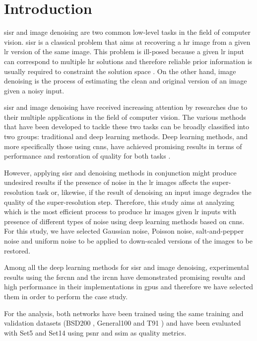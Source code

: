 \section{Introduction}

\Gls{sisr} and image denoising are two common low-level tasks in the field of computer vision. \Gls{sisr} is a classical problem that aims at recovering a \gls{hr} image from a given \gls{lr} version of the same image. This problem is ill-posed because a given \gls{lr} input can correspond to multiple \gls{hr} solutions and therefore reliable prior information is usually required to constraint the solution space \cite{DBLP:SISR} \cite{SRCNN} \cite{DBLP:DEEPSISR}. On the other hand, image denoising is the process of estimating the clean and original version of an image given a noisy input.

\gls{sisr} and image denoising have received increasing attention by researches due to their multiple applications in the field of computer vision. The various methods that have been developed to tackle these two tasks can be broadly classified into two groups: traditional and deep learning methods. Deep learning methods, and more specifically those using \glspl{cnn}, have achieved promising results in terms of performance and restoration of quality for both tasks \cite{DBLP:DEEPNR} \cite{DBLP:DEEPSISR}.

However, applying \gls{sisr} and denoising methods in conjunction might produce undesired results if the presence of noise in the \gls{lr} images affects the super-resolution task or, likewise, if the result of denoising an input image degrades the quality of the super-resolution step. Therefore, this study aims at analyzing which is the most efficient process to produce \gls{hr} images given \gls{lr} inputs with presence of different types of noise using deep learning methods based on \glspl{cnn}. For this study, we have selected Gaussian noise, Poisson noise, salt-and-pepper noise and uniform noise to be applied to down-scaled versions of the images to be restored.

Among all the deep learning methods for \gls{sisr} and image denoising, experimental results using the \gls{fsrcnn} \cite{FSRCNN} and the \gls{ircnn} \cite{IRCNN} have demonstrated promising results and high performance in their implementations in \glspl{gpu} and therefore we have selected them in order to perform the case study.

For the analysis, both networks have been trained using the same training and validation datasets (BSD200 \cite{BSDS}, General100 \cite{FSRCNN} and T91 \cite{T91}) and have been evaluated with Set5 \cite{SET5} and Set14 \cite{SET14} using \gls{psnr} and \gls{ssim} as quality metrics.

